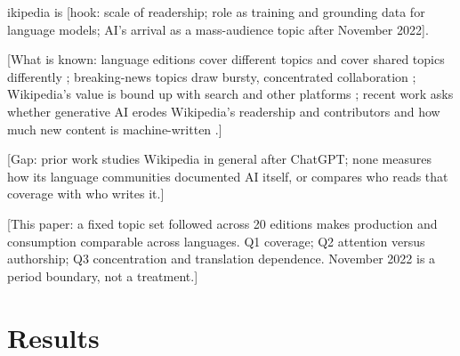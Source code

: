\documentclass[9pt,twocolumn,twoside]{pnas-new}
\begin{document}

\maketitle
\thispagestyle{firststyle}

\Firstpage

ikipedia is [hook: scale of readership; role as training and grounding data for language models; AI's arrival as a mass-audience topic after November 2022].

[What is known: language editions cover different topics and cover shared topics differently \cite{hecht2010tower,callahan2011cultural,roy2022asymmetry}; breaking-news topics draw bursty, concentrated collaboration \cite{keegan2013hot}; Wikipedia's value is bound up with search and other platforms \cite{mcmahon2017interdependence,vincent2018examining,okoli2014readers}; recent work asks whether generative AI erodes Wikipedia's readership and contributors \cite{reeves2024chatgpt,lyu2025wikipedia,wagner2025death} and how much new content is machine-written \cite{brooks2024rise}.]

[Gap: prior work studies Wikipedia in general after ChatGPT; none measures how its language communities documented AI itself, or compares who reads that coverage with who writes it.]

[This paper: a fixed topic set followed across 20 editions makes production and consumption comparable across languages. Q1 coverage; Q2 attention versus authorship; Q3 concentration and translation dependence. November 2022 is a period boundary, not a treatment.]\Endparasplit

\section*{Results}
\end{document}

